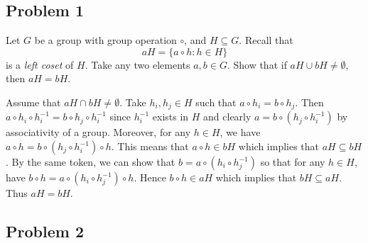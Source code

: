 \documentclass[../hw_sols.tex]{subfiles}
\begin{document}

\subsection*{Problem 1}

Let $G$ be a group with group operation $\circ$, and $H \subseteq G$. Recall 
that
	$$aH = \{a \circ h: h \in H\}$$
is a \textit{left coset} of $H$. Take any two elements $a, b \in G$. Show that 
if $aH \cup bH \neq \emptyset$, then $aH = bH$.

\begin{solution}
Assume that $aH \cap bH \neq \emptyset$. Take $h_i,h_j \in H$ such that 
$a \circ h_i = b \circ h_j$. Then 
$a \circ h_i \circ h_i^{-1} = b \circ h_j \circ h_i^{-1}$ since $h_i^{-1}$ 
exists in $H$ and clearly $a = b \circ \left( h_j \circ h_i^{-1} \right)$ by 
associativity of a group. Moreover, for any $h \in H$, we have 
$a \circ h = b \circ \left( h_j \circ h_i^{-1} \right) \circ h$. This means 
that $a \circ h \in bH$ which implies that $aH \subseteq bH$. By the same 
token, we can show that $b = a \circ \left( h_i \circ h_j^{-1} \right)$ so 
that for any $h \in H$, have 
$b \circ h = a \circ \left( h_i \circ h_j^{-1} \right) \circ h$. Hence 
$b \circ h \in aH$ which implies that $bH \subseteq aH$. Thus $aH = bH$.
\end{solution}


\newpage



\subsection*{Problem 2}
\end{document}
